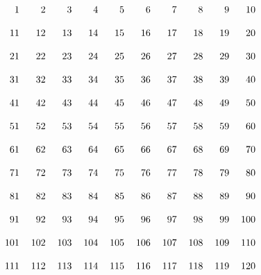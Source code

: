 \begin{prob}
\[\begin{tabular}{r r r r r r r r r r}
  1 &   2 &   3 &   4 &   5 &   6 &   7 &   8 &   9 &  10\\
  \\
 11 &  12 &  13 &  14 &  15 &  16 &  17 &  18 &  19 &  20\\
 \\
 21 &  22 &  23 &  24 &  25 &  26 &  27 &  28 &  29 &  30\\
 \\
 31 &  32 &  33 &  34 &  35 &  36 &  37 &  38 &  39 &  40\\
 \\
 41 &  42 &  43 &  44 &  45 &  46 &  47 &  48 &  49 &  50\\
 \\
 51 &  52 &  53 &  54 &  55 &  56 &  57 &  58 &  59 &  60\\
 \\
 61 &  62 &  63 &  64 &  65 &  66 &  67 &  68 &  69 &  70\\
 \\
 71 &  72 &  73 &  74 &  75 &  76 &  77 &  78 &  79 &  80\\
 \\
 81 &  82 &  83 &  84 &  85 &  86 &  87 &  88 &  89 &  90\\
 \\
 91 &  92 &  93 &  94 &  95 &  96 &  97 &  98 &  99 & 100\\
 \\
101 & 102 & 103 & 104 & 105 & 106 & 107 & 108 & 109 & 110\\
\\
111 & 112 & 113 & 114 & 115 & 116 & 117 & 118 & 119 & 120\\
\end{tabular}
\]
\end{prob}


